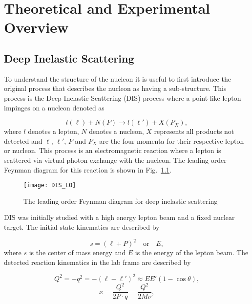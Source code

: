 \chapter{Theoretical and Experimental Overview} \label{ch::theory_exp}
\ifpdf
\graphicspath{{Chapters/Theory/Figs/}}
\fi

\section{Deep Inelastic Scattering}
To understand the structure of the nucleon it is useful to first introduce the
original process that describes the nucleon as having a sub-structure.  This
process is the Deep Inelastic Scattering (DIS) process where a point-like lepton
impinges on a nucleon denoted as

\begin{equation}
l(\ell) + N(P) \rightarrow l(\ell') + X(P_X),
\end{equation}
\noindent
where $l$ denotes a lepton, $N$ denotes a nucleon, $X$ represents all products
not detected and $\ell$, $\ell'$, $P$ and $P_X$ are the four momenta for their
respective lepton or nucleon.  This process is an electromagnetic reaction where
a lepton is scattered via virtual photon exchange with the nucleon.  The
leading order Feynman diagram for this reaction is shown in
Fig.~\ref{fig::DIS_LO}.

\begin{figure}[h!t]
  \centering
  \texttt{[image: DIS\_LO]}
  \caption{The leading order Feynman diagram for deep inelastic scattering}
  \label{fig::DIS_LO}
\end{figure}

DIS was initially studied with a high energy lepton beam and a fixed nuclear
target.  The initial state kinematics are described by

\begin{equation}
  s = (\ell+P)^2 \quad \mathrm{or} \quad E,
\end{equation}
\noindent
where $s$ is the center of mass energy and $E$ is the energy of the lepton beam.
The detected reaction kinematics in the lab frame are described by

\begin{multicols}{2}
  \noindent
  \begin{equation}
    \label{equ::DIS_Q2}
    Q^2 = -q^2 = -(\ell - \ell')^2 \approx EE'(1-\cos\theta ),
  \end{equation}
  \begin{equation}
      \label{equ::BjorkenX}
      x = \frac{Q^2}{2P \cdot q} = \frac{Q^2}{2M\nu},
  \end{equation}
\end{multicols}

